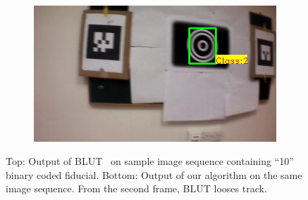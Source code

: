 \documentclass[10pt,twocolumn,letterpaper]{article}
\begin{document}
\begin{figure}
\begin{subfigure}[b]{.19\textwidth}
\end{subfigure}
\begin{subfigure}[b]{.19\textwidth}
\includegraphics[width=\linewidth]{BLUT_input_10/output5.jpg}
\end{subfigure}
\caption{Top: Output of BLUT~\cite{Wu:2011} on sample image sequence containing
``10'' binary coded fiducial. Bottom: Output of our algorithm on the same image
sequence. From the second frame, BLUT looses track.}
\label{fig:BLUT_compare_10}
\end{figure}
\end{document}
